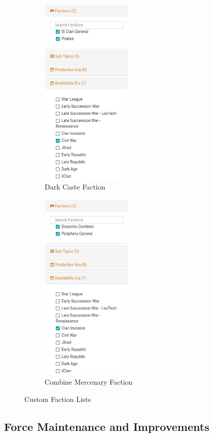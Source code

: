\documentclass{article}
\begin{document}
\begin{figure}[h!]
  \centering
  \begin{subfigure}{0.4\textwidth}
    \centering
    \includegraphics[height=3.6in]{../img/Dark_Caste_List.png}
    \caption*{Dark Caste Faction}
  \end{subfigure}
  \hspace{1in}
  \begin{subfigure}{0.4\textwidth}
    \centering
    \includegraphics[height=3.6in]{../img/Combine_Mercenary_List.png}
    \caption*{Combine Mercenary Faction}
  \end{subfigure}
  \caption*{Custom Faction Lists}
\end{figure}

\newpage

\subsection{Force Maintenance and Improvements}
\end{document}
